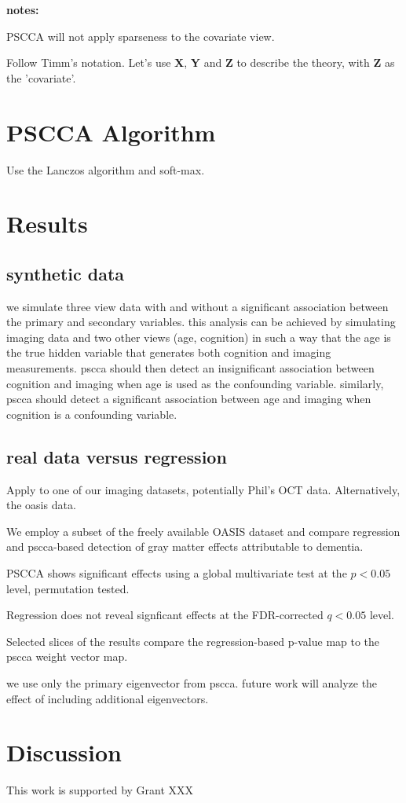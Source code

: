 \documentclass{llncs}
\begin{document}
{\bf notes:}

PSCCA will not apply sparseness to the covariate view.  

Follow Timm's notation.  Let's use {\bf  X}, {\bf Y} and {\bf Z} to describe the theory, with {\bf Z} as the
'covariate'.   

\section{PSCCA Algorithm}
Use the Lanczos algorithm and soft-max.

\section{Results}
\subsection{synthetic data}
we simulate three view data with and without a significant association
between the primary and secondary variables.  this analysis can be
achieved by simulating imaging data and two other views (age,
cognition) in such a way that the age is the true hidden variable that
generates both cognition and imaging measurements.  pscca should then
detect an insignificant association between cognition and imaging when
age is used as the confounding variable.  similarly, pscca should
detect a significant association between age and imaging when
cognition is a confounding variable.   

\subsection{real data versus regression}
Apply to one of our imaging datasets, potentially Phil's OCT data.
Alternatively, the oasis data. 

We employ a subset of the freely available OASIS dataset and compare
regression and pscca-based detection of gray matter effects
attributable to dementia.

PSCCA shows significant effects using a global multivariate test at
the $p<0.05$ level, permutation tested.  

Regression does not reveal signficant effects at the FDR-corrected
$q<0.05$ level.  

Selected slices of the results compare the regression-based p-value
map to the pscca weight vector map.  

we use only the primary eigenvector from pscca.  future work will
analyze the effect of including additional eigenvectors. 

\section{Discussion}

 This work is supported by Grant XXX 


\end{document}
